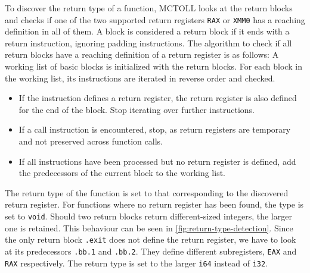 To discover the return type of a function, MCTOLL looks at the return blocks and checks if one of the two supported return registers \texttt{RAX} or \texttt{XMM0} has a reaching definition in all of them.
A block is considered a return block if it ends with a return instruction, ignoring padding instructions.
The algorithm to check if all return blocks have a reaching definition of a return register is as follows:
A working list of basic blocks is initialized with the return blocks.
For each block in the working list, its instructions are iterated in reverse order and checked.
\begin{itemize}
    \item If the instruction defines a return register, the return register is also defined for the end of the block.
    Stop iterating over further instructions.
    \item If a call instruction is encountered, stop, as return registers are temporary and not preserved across function calls.
    \item If all instructions have been processed but no return register is defined, add the predecessors of the current block to the working list.
\end{itemize}

The return type of the function is set to that corresponding to the discovered return register.
For functions where no return register has been found, the type is set to \texttt{void}.
Should two return blocks return different-sized integers, the larger one is retained.
This behaviour can be seen in \cref{fig:return-type-detection}.
Since the only return block \texttt{.exit} does not define the return register, we have to look at its predecessors \texttt{.bb.1} and \texttt{.bb.2}.
They define different subregisters, \texttt{EAX} and \texttt{RAX} respectively.
The return type is set to the larger \texttt{i64} instead of \texttt{i32}.

%

